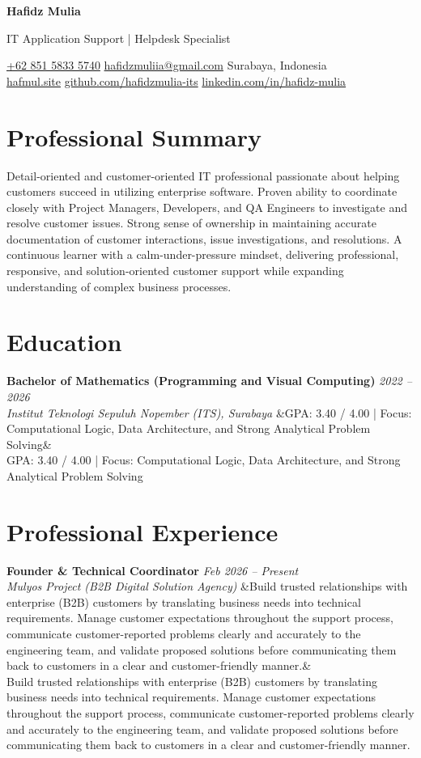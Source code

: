 \documentclass[a4paper,11pt]{article}
\newcommand{\cvname}[1]{%
  {\centering\LARGE\bfseries #1\par\vspace{2pt}}%
}
\newcommand{\cvtitle}[1]{%
  {\centering\large\color{accent} #1\par\vspace{4pt}}%
}
\newcommand{\cvcontact}[1]{%
  {\centering\small #1\par\vspace{6pt}}%
}
\newcommand{\cventry}[4]{%
  \noindent\textbf{#1} \hfill \textit{#3} \\
  \textit{#2}
  \ifx&#4& \else \\ \small #4 \fi
  \vspace{6pt}
}
\begin{document}
\cvname{Hafidz Mulia}
\cvtitle{IT Application Support | Helpdesk Specialist}
\cvcontact{%
  \href{tel:+6285158335740}{+62 851 5833 5740} \quad\textbar\quad
  \href{mailto:hafidzmuliia@gmail.com}{hafidzmuliia@gmail.com} \quad\textbar\quad
  Surabaya, Indonesia \\
  \href{https://hafmul.site}{hafmul.site} \quad\textbar\quad
  \href{https://github.com/hafidzmulia-its}{github.com/hafidzmulia-its} \quad\textbar\quad
  \href{https://www.linkedin.com/in/hafidz-mulia/}{linkedin.com/in/hafidz-mulia}
}

\section{Professional Summary}
Detail-oriented and customer-oriented IT professional passionate about helping customers succeed in utilizing enterprise software. Proven ability to coordinate closely with Project Managers, Developers, and QA Engineers to investigate and resolve customer issues. Strong sense of ownership in maintaining accurate documentation of customer interactions, issue investigations, and resolutions. A continuous learner with a calm-under-pressure mindset, delivering professional, responsive, and solution-oriented customer support while expanding understanding of complex business processes.

\section{Education}
\cventry
  {Bachelor of Mathematics (Programming and Visual Computing)}
  {Institut Teknologi Sepuluh Nopember (ITS), Surabaya}
  {2022 -- 2026}
  {GPA: 3.40 / 4.00 | Focus: Computational Logic, Data Architecture, and Strong Analytical Problem Solving}

\section{Professional Experience}

\cventry
  {Founder \& Technical Coordinator}
  {Mulyos Project (B2B Digital Solution Agency)}
  {Feb 2026 -- Present}
  {Build trusted relationships with enterprise (B2B) customers by translating business needs into technical requirements. Manage customer expectations throughout the support process, communicate customer-reported problems clearly and accurately to the engineering team, and validate proposed solutions before communicating them back to customers in a clear and customer-friendly manner.}
\end{document}
